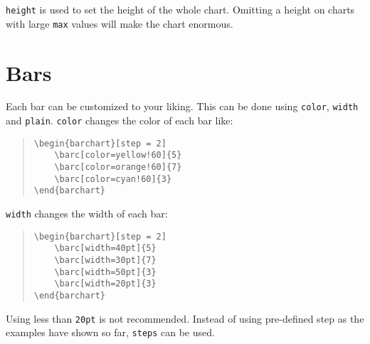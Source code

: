 \documentclass[]{article}
\begin{document}
\texttt{height} is used to set the height of the whole chart. Omitting a height on charts with large \texttt{max} values will make the chart enormous.

\section{Bars}
Each bar can be customized to your liking. This can be done using \texttt{color}, \texttt{width} and \texttt{plain}.
\texttt{color} changes the color of each bar like:


\begin{quote}\small
\begin{verbatim}
\begin{barchart}[step = 2]    
    \barc[color=yellow!60]{5}
    \barc[color=orange!60]{7}
    \barc[color=cyan!60]{3}
\end{barchart}
\end{verbatim}
\end{quote}
\begin{quote}\small
\begin{figure}[ht]
	\begin{barchart}[step = 2]
	\end{barchart}
\end{figure}
\end{quote}

\texttt{width} changes the width of each bar:

\begin{quote}\small
\begin{verbatim}
\begin{barchart}[step = 2]
    \barc[width=40pt]{5}
    \barc[width=30pt]{7}
    \barc[width=50pt]{3}
    \barc[width=20pt]{3}
\end{barchart}
\end{verbatim}
\end{quote}
\begin{quote}\small
\begin{figure}[ht]
	\begin{barchart}[step = 2]
	\end{barchart}
\end{figure}
\end{quote}
Using less than \texttt{20pt} is not recommended. Instead of using pre-defined step as the examples have shown so far, \texttt{steps} can be used.
\end{document}
